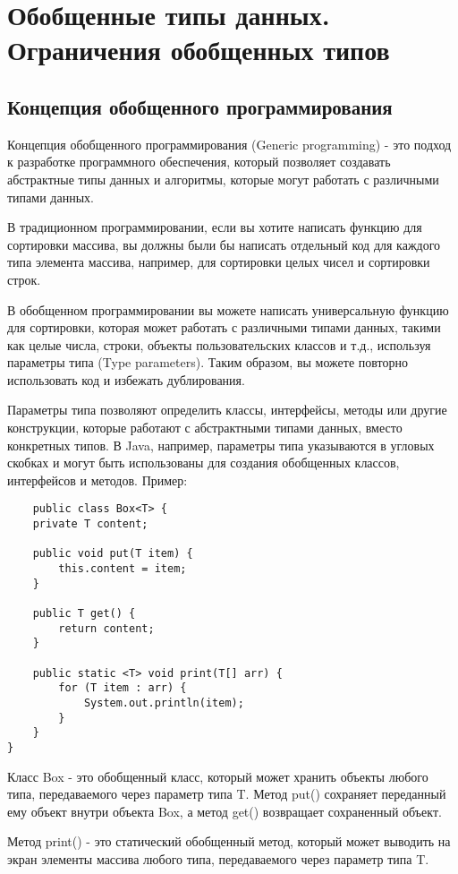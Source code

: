 \newpage
\chapter{Обобщенные типы данных. Ограничения обобщенных типов}
\section{Концепция обобщенного программирования}
Концепция обобщенного программирования (Generic programming) - это подход к разработке программного обеспечения, который позволяет создавать абстрактные типы данных и алгоритмы, которые могут работать с различными типами данных.

В традиционном программировании, если вы хотите написать функцию для сортировки массива, вы должны были бы написать отдельный код для каждого типа элемента массива, например, для сортировки целых чисел и сортировки строк.

В обобщенном программировании вы можете написать универсальную функцию для сортировки, которая может работать с различными типами данных, такими как целые числа, строки, объекты пользовательских классов и т.д., используя параметры типа (Type parameters). Таким образом, вы можете повторно использовать код и избежать дублирования.

Параметры типа позволяют определить классы, интерфейсы, методы или другие конструкции, которые работают с абстрактными типами данных, вместо конкретных типов. В Java, например, параметры типа указываются в угловых скобках и могут быть использованы для создания обобщенных классов, интерфейсов и методов.
Пример:
\begin{lstlisting}
    public class Box<T> {
    private T content;

    public void put(T item) {
        this.content = item;
    }

    public T get() {
        return content;
    }

    public static <T> void print(T[] arr) {
        for (T item : arr) {
            System.out.println(item);
        }
    }
}
\end{lstlisting}
Класс Box - это обобщенный класс, который может хранить объекты любого типа, передаваемого через параметр типа T. Метод put() сохраняет переданный ему объект внутри объекта Box, а метод get() возвращает сохраненный объект.

Метод print() - это статический обобщенный метод, который может выводить на экран элементы массива любого типа, передаваемого через параметр типа T.

